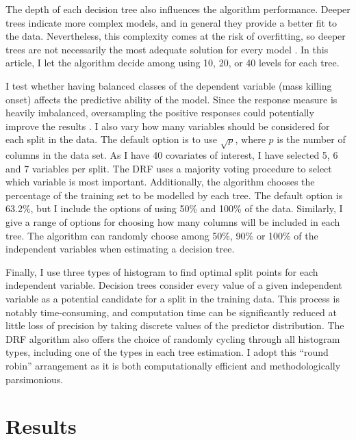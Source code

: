 \documentclass[a4paper,12pt]{article}
\begin{document}
The depth of each decision tree also influences the algorithm performance. Deeper trees indicate more complex models, and in general they provide a better fit to the data. Nevertheless, this complexity comes at the risk of overfitting, so deeper trees are not necessarily the most adequate solution for every model \citep[596]{friedman2001greedy,segal2004machine}. In this article, I let the algorithm decide among using 10, 20, or 40 levels for each tree. 
	
I test whether having balanced classes of the dependent variable (mass killing onset) affects the predictive ability of the model. Since the response measure is heavily imbalanced, oversampling the positive responses could potentially improve the results \citep{chawla2004special,del2014use,japkowicz2002class}. 
I also vary how many variables should be considered for each split in the data. The default option is to use $\sqrt{p}$, where $p$ is the number of columns in the data set. As I have 40 covariates of interest, I have selected 5, 6 and 7 variables per split. The DRF uses a majority voting procedure to select which variable is most important. Additionally, the algorithm chooses the percentage of the training set to be modelled by each tree. The default option is 63.2\%, but I include the options of using 50\% and 100\% of the data. Similarly, I give a range of options for choosing how many columns will be included in each tree. The algorithm can randomly choose among 50\%, 90\% or 100\% of the independent variables when estimating a decision tree.

Finally, I use three types of histogram to find optimal split points for each independent variable. Decision trees consider every value of a given independent variable as a potential candidate for a split in the training data. This process is notably time-consuming, and computation time can be significantly reduced at little loss of precision by taking discrete values of the predictor distribution. The DRF algorithm also offers the choice of randomly cycling through all histogram types, including one of the types in each tree estimation. I adopt this ``round robin'' arrangement as it is both computationally efficient and methodologically parsimonious.
	
\section{Results}
\label{sec:results}
	
\end{document}
